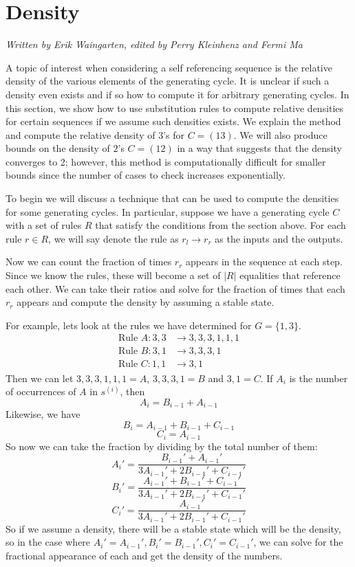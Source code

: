\documentclass[runningheads,a4paper]{llncs}
\begin{document}
\section{Density}
\label{density}
\emph{Written by Erik Waingarten, edited by Perry Kleinhenz and Fermi Ma}

A topic of interest when considering a self referencing sequence is the relative density of the various elements of the generating cycle. It is unclear if such a density even exists and if so how to compute it for arbitrary generating cycles. In this section, we show how to use substitution rules to compute relative densities for certain sequences if we assume such densities exists. We explain the method and compute the relative density of 3's for $C = (1 3)$. We will also produce bounds on the density of $2$'s $C = (1 2)$ in a way that suggests that the density converges to 2; however, this method is computationally difficult for smaller bounds since the number of cases to check increases exponentially. 

To begin we will discuss a technique that can be used to compute the densities for some generating cycles. In particular, suppose we have a generating cycle $C$ with a set of rules $R$ that satisfy the conditions from the section above. For each rule $r \in R$, we will say denote the rule as $r_l \rightarrow r_r$ as the inputs and the outputs. 

Now we can count the fraction of times $r_r$ appears in the sequence at each step. Since we know the rules, these will become a set of $|R|$ equalities that reference each other. We can take their ratios and solve for the fraction of times that each $r_r$ appears and compute the density by assuming a stable state.

For example, lets look at the rules we have determined for $G = \{ 1, 3 \}$. 
\begin{align*}
\text{Rule }A: 3,3 &\to 3,3,3,1,1,1 \\
\text{Rule }B: 3,1 &\to 3,3,3,1\\
\text{Rule }C: 1,1 &\to 3,1
\end{align*}
Then we can let $3,3,3,1,1,1 = A$, $3,3,3,1 = B$ and $3, 1 = C$. If $A_i$ is the number of occurrences of $A$ in $s^{(i)}$, then 
\[ A_i = B_{i-1} + A_{i-1} \]
Likewise, we have
\[ B_i = A_{i-1} + B_{i-1} + C_{i-1} \]
\[ C_i = A_{i-1} \]
So now we can take the fraction by dividing by the total number of them:
\[ A_i' = \dfrac{B_{i-1}' + A_{i-1}'}{3A_{i-1}' + 2B_{i-1}' + C_{i-1}'} \]
\[ B_i' = \dfrac{A_{i-1}' + B_{i-1}' + C_{i-1}'}{3A_{i-1}' + 2B_{i-1}' + C_{i-1}'} \]
\[ C_i' = \dfrac{A_{i-1}'}{3A_{i-1}' + 2B_{i-1}' + C_{i-1}'} \]
So if we assume a density, there will be a stable state which will be the density, so in the case where $A_i'=A_{i-1}', B_i' = B_{i-1}', C_i'=C_{i-1}'$, we can solve for the fractional appearance of each and get the density of the numbers.
\end{document}

